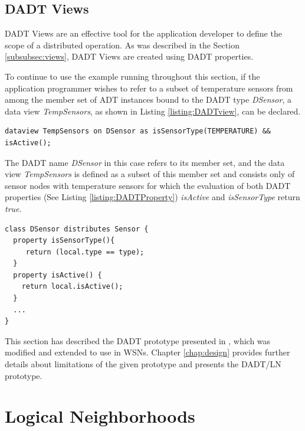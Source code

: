 \subsection{DADT Views} \label{subsubsec:viewsImpl}

DADT Views are an effective tool for the application developer to
define the scope of a distributed operation. As was described in the Section
\ref{subsubsec:views}, DADT Views are created using DADT properties.

To continue to use the example running throughout this section, if the application programmer wishes to refer to a subset of temperature sensors from among the member set of ADT instances bound to the DADT type \emph{DSensor}, a data view \emph{TempSensors}, 
as shown in Listing \ref{listing:DADTview}, can be declared.
  
\begin{lstlisting}[frame=trbl, basewidth={0.55em, 0.6em}, captionpos=b, 
basicstyle=\ttfamily\footnotesize, breaklines, caption = Definition of DADT Data View, label = listing:DADTview ]  
dataview TempSensors on DSensor as isSensorType(TEMPERATURE) && isActive(); 
\end{lstlisting}

The DADT name \emph{DSensor} in this case refers to its member set, and 
the data view \emph{TempSensors} is defined as a subset of this member set and
consists only of sensor nodes with temperature sensors for which the evaluation of
both DADT properties (See Listing \ref{listing:DADTProperty}) \emph{isActive}
and \emph{isSensorType} return \emph{true}. 

\begin{lstlisting}[frame=trbl, basewidth={0.55em, 0.6em}, captionpos=b, 
basicstyle=\ttfamily\footnotesize, breaklines, caption = Definition of DADT Properties, label = listing:DADTProperty ]  
class DSensor distributes Sensor {
  property isSensorType(){
	 return (local.type == type);
  }
  property isActive() {
	return local.isActive();
  }
  ...
}

\end{lstlisting}

This section has described the DADT prototype presented in
\cite{migliavacca_DADT:2006}, which was modified and extended to use in WSNs. 
Chapter \ref{chap:design} provides further details about limitations of the
given prototype and presents the DADT/LN prototype. 

\section {Logical Neighborhoods} \label{LNDescription}


